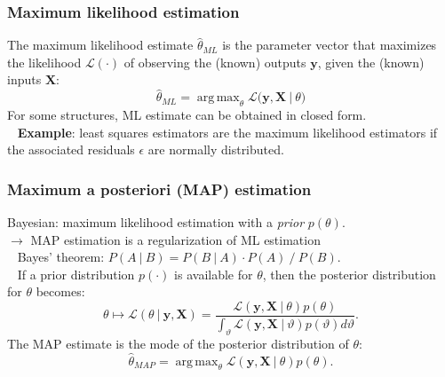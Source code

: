 \documentclass{beamer}
\DeclareMathOperator*{\argmax}{arg\,max}
\begin{document}
\begin{frame}
\frametitle{Maximum likelihood estimation}
The maximum likelihood estimate $\hat{\theta}_{ML}$ is the parameter vector that maximizes the likelihood $\mathcal{L}(\cdot)$ of observing the (known) outputs $\mathbf{y}$, given the (known) inputs $\mathbf{X}$:
\begin{equation*}
\hat{\theta}_{ML} = \argmax_{\theta} \mathcal{L}\big(\mathbf{y}, \mathbf{X}\ |\ \theta \big)
\end{equation*}
\pause
For some structures, ML estimate can be obtained in closed form.\\
\ \newline
\pause
\textbf{Example}: least squares estimators are the maximum likelihood estimators if the associated residuals $\epsilon$ are normally distributed.
\end{frame}

\begin{frame}
\frametitle{Maximum a posteriori (MAP) estimation}
Bayesian: maximum likelihood estimation with a \emph{prior} $p(\theta)$. \\
$\rightarrow$ MAP estimation is a regularization of ML estimation \\
\ \newline
\pause
Bayes' theorem: $P(A\ |\ B) = P(B\ |\ A) \cdot P(A)\ /\ P(B)$.\\
\ \newline
\pause
If a prior distribution $p(\cdot)$ is available for $\theta$, then the posterior distribution for $\theta$ becomes:
\begin{equation*}
\theta \mapsto \mathcal{L}(\theta\ |\ \mathbf{y}, \mathbf{X}) = \frac{\mathcal{L}(\mathbf{y}, \mathbf{X}\ |\ \theta)p(\theta)}{\int_\vartheta \mathcal{L}(\mathbf{y}, \mathbf{X}\ |\ \vartheta)p(\vartheta)d\vartheta}.
\end{equation*}
\pause
The MAP estimate is the mode of the posterior distribution of $\theta$:
\begin{equation*}
\hat{\theta}_{MAP} = \argmax_{\theta} \mathcal{L}(\mathbf{y}, \mathbf{X}\ |\ \theta) p(\theta).
\end{equation*}

\end{frame}
\end{document}
